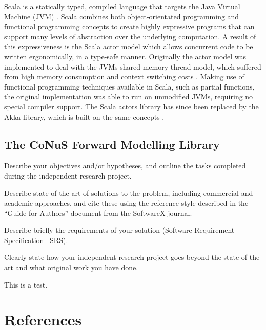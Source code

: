 \documentclass[12pt]{article}
\begin{document}
Scala is a statically typed, compiled language that targets the Java Virtual Machine (JVM) \cite{scala}. Scala combines both object-orientated programming and functional programming concepts to create highly expressive programs that can support many levels of abstraction over the underlying computation. A result of this expressiveness is the Scala actor model which allows concurrent code to be written ergonomically, in a type-safe manner. Originally the actor model was implemented to deal with the JVMs shared-memory thread model, which suffered from high memory consumption and context switching costs \cite{haller_odersky_2009}. Making use of functional programming techniques available in Scala, such as partial functions, the original implementation was able to run on unmodified JVMs, requiring no special compiler support. The Scala actors library has since been replaced by the Akka library, which is built on the same concepts \cite{}.



\subsection{The CoNuS Forward Modelling Library}


Describe your objectives and/or hypotheses, and outline the tasks completed during the independent research project. 

Describe state-of-the-art of solutions to the problem, including commercial and academic approaches, and cite these using the reference style described in the “Guide for Authors” document from the SoftwareX journal.

Describe briefly the requirements of your solution (Software Requirement Specification –SRS). 

Clearly state how your independent research project goes beyond the state-of-the-art and what original work you have done.

	
This is a test. \cite{ALSALMI201945}

\section{References} 
\printbibliography[heading=none]
\end{document}
